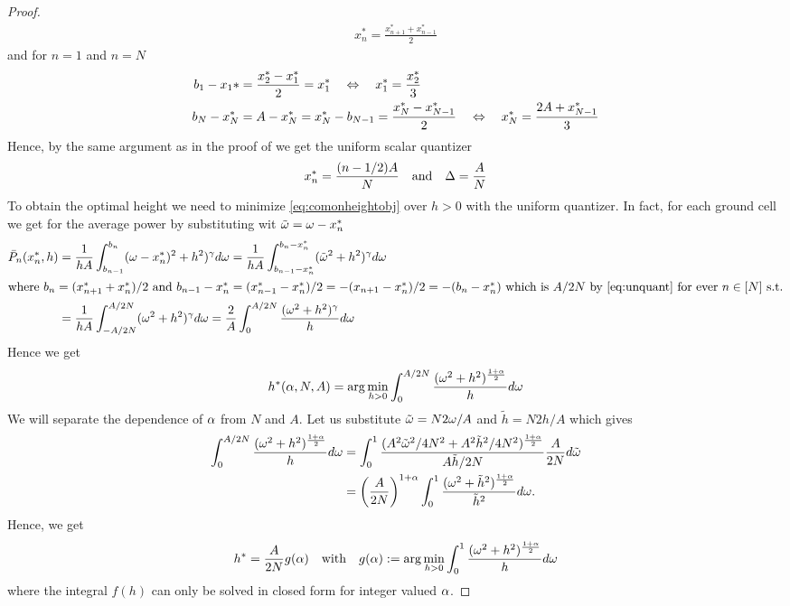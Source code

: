 \documentclass[smallabstract,smallcaptions]{dccpaper}
\newcommand{\Pbar}{\ensuremath{\bar{P}}}         %
\begin{document}
\begin{proof}
\begin{align}
  x_n^*=\frac{x_{n+1}^*+x_{n-1}^*}{2}
\end{align}
%
and for $n=1$ and $n=N$
%
\begin{align}
  b_1-x_1* &=\frac{x^*_2-x^*_1}{2}=x_1^*\quad \Leftrightarrow\quad x^*_1=\frac{x^*_2}{3}\\
  b_N-x_N^*&=A-x_N^*=x_N^*-b_{N-1}=\frac{x_{N}^*-x_{N-1}^*}{2} \quad\Leftrightarrow \quad x_N^*= \frac{2A+x_{N-1}^*}{3}
\end{align}
%
Hence, by the same argument as in the proof  of 
we get the uniform scalar quantizer
%
\begin{align}
  x_n^*= \frac{(n-1/2)A}{N}\quad\text{and}\quad \Delta = \frac{A}{N}\label{eq:unquant}
\end{align}
%
To obtain the optimal height we need to minimize \eqref{eq:comonheightobj} over $h>0$ with the uniform quantizer. In
fact, for each ground cell we get for the average power by substituting wit ${  \tilde{\omega} }=\omega-x_n^*$
%
\begin{align}
  \Pbar_n(x_n^*,h) &= \frac{1}{hA} \int_{b_{n-1}}^{b_n} (\ome-x_n^*)^2+h^2)^{\gam}d\ome
 = \frac{1}{hA} \int_{b_{n-1}-x_n^*}^{b_n-x_n^*} (\tome^2+h^2)^{\gam} d\ome\\
\intertext{where $b_n=(x_{n+1}^*+x_n^*)/2$ and
$b_{n-1}- x_n^*=(x_{n-1}^*-x_n^*)/2=-(x_{n+1}-x_n^*)/2= -(b_n-x_n^*)$ which is $A/2N$ by \eqref{eq:unquant} for ever
$n\in[N]$ s.t.}
&=\frac{1}{hA}\int_{-A/2N}^{A/2N} (\ome^2+h^2)^{\gam}d\ome=\frac{2}{A} \int_0^{A/2N} \frac{(\ome^2+h^2)^{\gam}}{h}d\ome 
\end{align}
%
Hence we get
%
\begin{align}
  h^*(\alpha,N,A)=\arg\min_{h>0} \int_0^{A/2N} \frac{(\omega^2+h^2)^{\frac{1+\alpha}{2}}}{h}d\omega \label{eq:hstar}
\end{align}
%
We will separate the dependence of $\alpha$  from $N$ and $A$. Let us substitute ${  \tilde{\omega} }=N2\omega/A$ and $\tilde{h}=N2h/A$
which gives
%
\begin{align}
  \int_{0}^{A/2N} \frac{(\omega^2+h^2)^{\frac{1+\alpha}{2}}}{h} d\omega
  &= \int_0^{1} \frac{ (A^2{  \tilde{\omega} }^2/4N^2   + A^2\tilde{h}^2/4N^2)^{\frac{1+\alpha}{2}}}{A\tilde{h}/2N}
  \frac{A}{2N}d{  \tilde{\omega} }\\
  &= \left(\frac{A}{2N}\right)^{1+\alpha}\int_0^{1} \frac{ (\omega^2   + \tilde{h}^2)^{\frac{1+\alpha}{2}}}{\tilde{h}^2}
  d\omega.
\end{align}
%
Hence, we get 
%
\begin{align}
  h^*=\frac{A}{2N} g(\alpha)\quad\text{with}\quad  g(\alpha):=\arg\min_{h>0} \int_0^{1} \frac{(\omega^2+h^2)^{\frac{1+\alpha}{2}}}{h} d\omega
  \label{eq:galp}
\end{align}
%
where the integral $f(h)$ can only be solved in closed form for integer valued $\alpha$. 


\end{proof}
\end{document}
